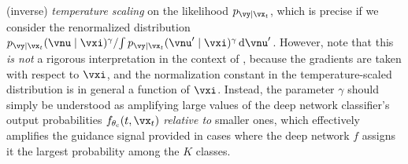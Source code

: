 \documentclass[../../book-main.tex]{subfiles}
\begin{document}
(inverse) \textit{temperature scaling} on the likelihood
$p_{\vy \mid \vx_t}$, which is precise if we consider the renormalized
distribution 
$ { p_{\vy \mid \vx_t}(\vnu\mid \vxi)^\gamma } / { \int p_{\vy \mid \vx_t}(\vnu'\mid
\vxi)^\gamma \odif \vnu' } $.
However, note that this \textit{is not} a rigorous interpretation in the context
of , because the
gradients are taken with respect to $\vxi$, and the normalization constant in
the temperature-scaled distribution is in general a function of $\vxi$.
Instead, the parameter $\gamma$ should simply be understood as amplifying large
values of the deep network classifier's output probabilities
$f_{\theta_{\mathrm{c}}}(t, \vx_t)$ \textit{relative to} smaller ones,
which effectively amplifies the guidance signal provided in cases where the deep
network $f$ assigns it the largest probability among the $K$ classes.

\end{document}
